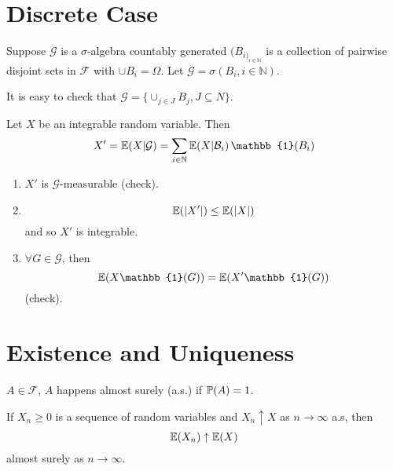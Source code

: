 \section{Discrete Case}
\label{sec:discrete-case}

Suppose $\mathcal{G}$ is a $\sigma$-algebra countably generated
$(B_{i)_{i \in \mathbb{N}}}$ is a collection of pairwise disjoint sets
in $\mathcal{F}$ with $\cup B_{i} = \Omega$. Let $\mathcal{G} =
\sigma(B_{i}, i \in \mathbb{N})$.

It is easy to check that $\mathcal{G} = \{ \cup_{j \in J} B_{j}, J
\subseteq {N} \}$.

Let $X$ be an integrable random variable.  Then
\begin{align*}
  X' = \E{X | \mathcal{G}} = \sum_{i \in \mathbb{N}}
  \E{X | \mathcal{B}_{i}} \mathbb{1}(B_{i})
\end{align*}

\begin{enumerate}
\item $X'$ is $\mathcal{G}$-measurable (check).
\item
  \begin{equation}
    \label{eq:3}
    \E{|X'|} \leq \E{|X|}
  \end{equation} and so $X'$ is integrable.
\item $\forall G \in \mathcal{G}$, then
  \begin{equation}
    \label{eq:4}
    \E{X \mathbb{1}(G)} = \E{X' \mathbb{1}(G)}
  \end{equation} (check).
\end{enumerate}

\section{Existence and Uniqueness}
\label{sec:existence-uniqueness}

\begin{defn}
  \label{defn:8}
  $A \in \mathcal{F}$, $A$ happens almost surely (a.s.) if
  $\Prob{A} = 1$.
\end{defn}

\begin{thm}
  If $X_{n} \geq 0$ is a sequence of random variables and $X_{n}
  \uparrow X$ as $n \rightarrow \infty$ a.s, then
  \begin{equation}
    \label{eq:5}
    \E{X_{n}} \uparrow \E{X}
  \end{equation} almost surely as $n \rightarrow \infty$.
\end{thm}

